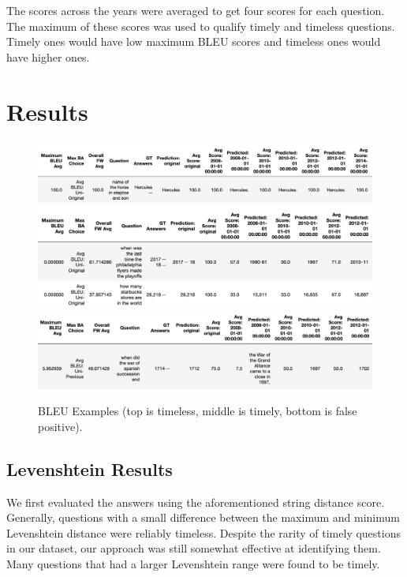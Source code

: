 \documentclass{article}
\begin{document}
The scores across the years were averaged to get four scores for each question.
The maximum of these scores was used to qualify timely and timeless questions.
Timely ones would have low maximum BLEU scores and timeless ones would have
higher ones.

\section{Results}
\label{results}
\begin{figure}[ht]
	\begin{center}
		\includegraphics[width=5in]{timeless bleu.png}
		\includegraphics[width=5in]{timely bleu.png}
		\includegraphics[width=5in]{bleu false pos.png}
	\end{center}
	\caption{BLEU Examples (top is timeless, middle is timely, bottom is false positive).}
	\label{fig:bleu_examples}
\end{figure}

\subsection{Levenshtein Results}
\label{fuzzy results}

We first evaluated the answers using the aforementioned string distance score.
Generally, questions with a small difference between the maximum and minimum
Levenshtein distance were reliably timeless. Despite the rarity of timely
questions in our dataset, our approach was still somewhat effective at
identifying them. Many questions that had a larger Levenshtein range were found
to be timely.
\end{document}
